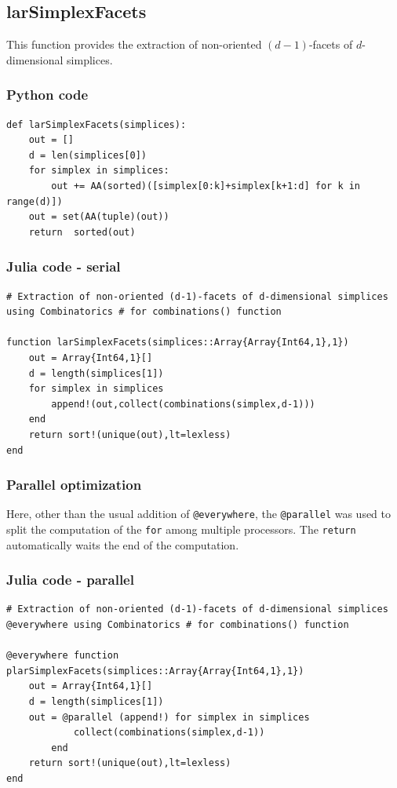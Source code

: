 \documentclass[a4paper,12pt,titlepage]{article}					%
\begin{document}
\subsection{larSimplexFacets}
This function provides the extraction of non-oriented $(d-1)$-facets of $d$-dimensional simplices.

\subsubsection{Python code}
\begin{verbatim}
def larSimplexFacets(simplices):
    out = []
    d = len(simplices[0])
    for simplex in simplices:
        out += AA(sorted)([simplex[0:k]+simplex[k+1:d] for k in range(d)])
    out = set(AA(tuple)(out))
    return  sorted(out)
\end{verbatim}

\subsubsection{Julia code - serial}
\begin{Verbatim}
# Extraction of non-oriented (d-1)-facets of d-dimensional simplices
using Combinatorics # for combinations() function

function larSimplexFacets(simplices::Array{Array{Int64,1},1})
	out = Array{Int64,1}[]
	d = length(simplices[1])
	for simplex in simplices
		append!(out,collect(combinations(simplex,d-1)))
	end
	return sort!(unique(out),lt=lexless)
end
\end{Verbatim}

\subsubsection{Parallel optimization}
Here, other than the usual addition of \texttt{@everywhere}, the \texttt{@parallel} was used to split the computation of the \texttt{for} among multiple processors.
The \texttt{return} automatically waits the end of the computation.

\subsubsection{Julia code - parallel}
\begin{Verbatim}
# Extraction of non-oriented (d-1)-facets of d-dimensional simplices
@everywhere using Combinatorics # for combinations() function

@everywhere function plarSimplexFacets(simplices::Array{Array{Int64,1},1})
	out = Array{Int64,1}[]
	d = length(simplices[1])
	out = @parallel (append!) for simplex in simplices
			collect(combinations(simplex,d-1))
		end
	return sort!(unique(out),lt=lexless)
end
\end{Verbatim}
\end{document}
